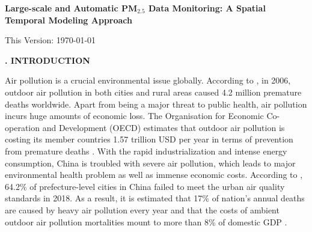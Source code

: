 \documentclass[12pt]{article}
\newcommand{\csection}[1]
    {\begin{center}
        \stepcounter{section}
        {\bf\large\arabic{section}. #1}
    \end{center}
    \vspace{-0.15 cm}
}
\numberwithin{equation}{section}
\begin{document}
\begin{center}
{\bf\Large Large-scale and Automatic PM$_{2.5}$ Data Monitoring: A Spatial Temporal Modeling Approach}\\
\bigskip

This Version: \today

\end{center}

\begin{singlespace}
\begin{abstract}


\end{abstract}
\end{singlespace}

\newpage

\csection{INTRODUCTION}

Air pollution is a crucial environmental issue globally. According to , in 2006, outdoor air pollution in both cities and rural areas caused 4.2 million premature deaths worldwide. Apart from being a major threat to public health, air pollution incurs huge amounts of economic loss.
The Organisation for Economic Co-operation and Development (OECD) estimates that outdoor air pollution is costing its member countries 1.57 trillion USD per year in terms of prevention from premature deaths \citep{web5}. With the rapid industrialization and intense energy consumption, China is troubled with severe air pollution, which leads to major environmental health problem as well as immense economic costs. According to , 64.2\% of prefecture-level cities in China failed to meet the urban air quality standards in 2018. As a result, it is estimated that 17\% of nation's annual deaths are caused by heavy air pollution every year and that the costs of ambient outdoor air pollution mortalities mount to more than 8\% of domestic GDP \citep{article11, OECD}.
\end{document}

